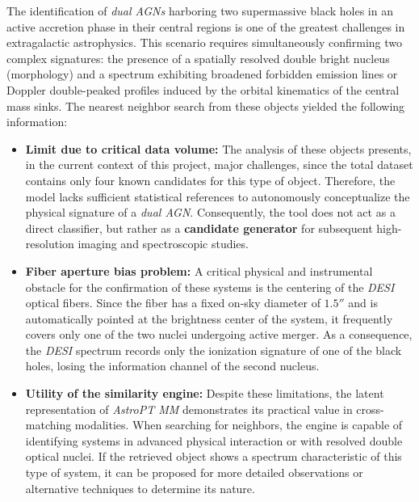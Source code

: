 The identification of \textit{dual \glspl{AGN}} harboring two supermassive black holes in an active accretion phase in their central regions is one of the greatest challenges in extragalactic astrophysics. This scenario requires simultaneously confirming two complex signatures: the presence of a spatially resolved double bright nucleus (morphology) and a spectrum exhibiting broadened forbidden emission lines or Doppler double-peaked profiles induced by the orbital kinematics of the central mass sinks. The nearest neighbor search from these objects yielded the following information:

\begin{itemize}
	\item \textbf{Limit due to critical data volume:} The analysis of these objects presents, in the current context of this project, major challenges, since the total dataset contains only four known candidates for this type of object. Therefore, the model lacks sufficient statistical references to autonomously conceptualize the physical signature of a \textit{dual \gls{AGN}}. Consequently, the tool does not act as a direct classifier, but rather as a \textbf{candidate generator} for subsequent high-resolution imaging and spectroscopic studies.

	\item \textbf{Fiber aperture bias problem:} A critical physical and instrumental obstacle for the confirmation of these systems is the centering of the \textit{\gls{DESI}} optical fibers. Since the fiber has a fixed on-sky diameter of $1.5''$ and is automatically pointed at the brightness center of the system, it frequently covers only one of the two nuclei undergoing active merger. As a consequence, the \textit{\gls{DESI}} spectrum records only the ionization signature of one of the black holes, losing the information channel of the second nucleus.

	\item \textbf{Utility of the similarity engine:} Despite these limitations, the latent representation of \textit{AstroPT MM} demonstrates its practical value in cross-matching modalities. When searching for neighbors, the engine is capable of identifying systems in advanced physical interaction or with resolved double optical nuclei. If the retrieved object shows a spectrum characteristic of this type of system, it can be proposed for more detailed observations or alternative techniques to determine its nature.
\end{itemize}
